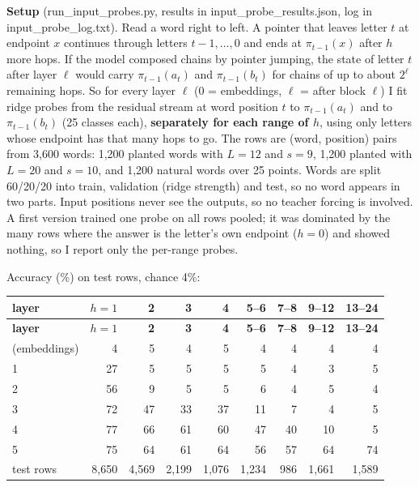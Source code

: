 \documentclass[paper=a4,fontsize=11pt,DIV=11,parskip=half,headings=small,numbers=noendperiod]{scrartcl}
\DeclareRobustCommand{\lead}[1]{\textsf{\bfseries\color{accent}#1}}
\DeclareRobustCommand{\code}[1]{{\fontseries{m}\ttfamily #1}}
\DeclareRobustCommand{\hdr}[1]{\textsf{\bfseries #1}}
\begin{document}
\lead{Setup} (\code{run\_\allowbreak{}input\_\allowbreak{}probes.\allowbreak{}py}, results in
\code{input\_\allowbreak{}probe\_\allowbreak{}results.\allowbreak{}json}, log in
\code{input\_\allowbreak{}probe\_\allowbreak{}log.\allowbreak{}txt}). Read a word right to left. A pointer that
leaves letter $t$ at endpoint $x$ continues through letters $t-1,\dots,0$ and ends at $\pi_{t-1}(x)$ after $h$
more hops. If the model composed chains by pointer jumping, the state of letter $t$ after layer $\ell$ would
carry $\pi_{t-1}(a_t)$ and $\pi_{t-1}(b_t)$ for chains of up to about $2^\ell$ remaining hops. So for every
layer $\ell$ (0 = embeddings, $\ell$ = after block $\ell$) I fit ridge probes from the residual stream at word
position $t$ to $\pi_{t-1}(a_t)$ and to $\pi_{t-1}(b_t)$ (25 classes each), \textbf{separately for each range of
$h$}, using only letters whose endpoint has that many hops to go. The rows are (word, position) pairs from 3,600
words: 1,200 planted words with $L=12$ and $s=9$, 1,200 planted with $L=20$ and $s=10$, and 1,200 natural words
over 25 points. Words are split 60/20/20 into train, validation (ridge strength) and test, so no word appears in
two parts. Input positions never see the outputs, so no teacher forcing is involved. A first version trained one
probe on all rows pooled; it was dominated by the many rows where the answer is the letter’s own endpoint
($h=0$) and showed nothing, so I report only the per-range probes.

Accuracy (\%) on test rows, chance 4\%:

{\small\nopagebreak[4]
\begin{longtable}{@{}l *{8}{r}@{}}
\toprule
\hdr{layer} & \hdr{$h=1$} & \hdr{2} & \hdr{3} & \hdr{4} & \hdr{5–6} & \hdr{7–8} & \hdr{9–12} & \hdr{13–24} \\
\midrule
\endfirsthead
\toprule
\hdr{layer} & \hdr{$h=1$} & \hdr{2} & \hdr{3} & \hdr{4} & \hdr{5–6} & \hdr{7–8} & \hdr{9–12} & \hdr{13–24} \\
\midrule
\endhead
\bottomrule
\endlastfoot
0 (embeddings) & 4 & 5 & 4 & 5 & 4 & 4 & 4 & 4 \\
1 & 27 & 5 & 5 & 5 & 5 & 4 & 3 & 5 \\
2 & 56 & 9 & 5 & 5 & 6 & 4 & 5 & 4 \\
3 & 72 & 47 & 33 & 37 & 11 & 7 & 4 & 5 \\
4 & 77 & 66 & 61 & 60 & 47 & 40 & 10 & 5 \\
5 & 75 & 64 & 61 & 64 & 56 & 57 & 64 & 74 \\
test rows & 8,650 & 4,569 & 2,199 & 1,076 & 1,234 & 986 & 1,661 & 1,589 \\
\end{longtable}}
\end{document}
